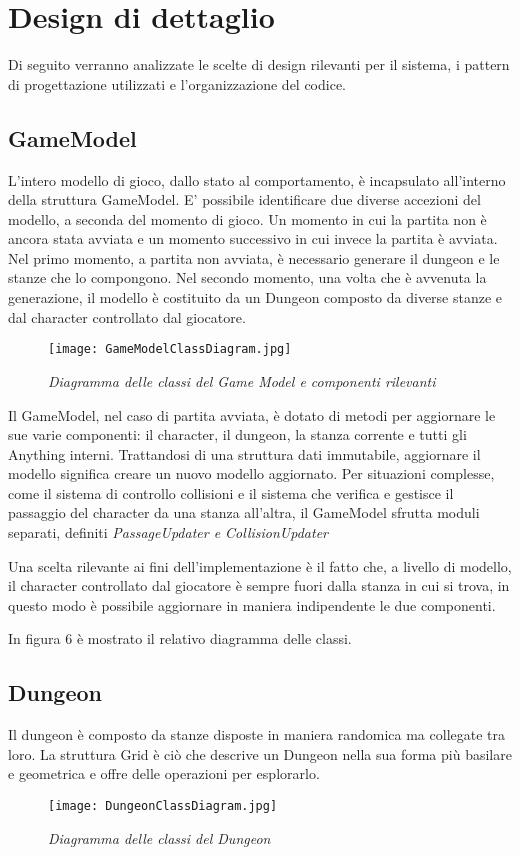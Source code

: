 \section{Design di dettaglio}
Di seguito verranno analizzate le scelte di design rilevanti per il sistema, i pattern di progettazione utilizzati e l'organizzazione del codice. 
\subsection{GameModel}
L'intero modello di gioco, dallo stato al comportamento, è incapsulato all'interno della struttura GameModel. E' possibile identificare due diverse accezioni del modello, a seconda del momento di gioco. 
Un momento in cui la partita non è ancora stata avviata e un momento successivo in cui invece la partita è avviata.
Nel primo momento, a partita non avviata, è necessario generare il dungeon e le stanze che lo compongono. 
Nel secondo momento, una volta che è avvenuta la generazione, il modello è costituito da un Dungeon composto da diverse stanze e dal character controllato dal giocatore. 

\begin{figure}[!hbt]
    \centering
    \texttt{[image: GameModelClassDiagram.jpg]}
    \caption{\textit{Diagramma delle classi del Game Model e componenti rilevanti}} 
\end{figure}
Il GameModel, nel caso di partita avviata, è dotato di metodi per aggiornare le sue varie componenti: il character, il dungeon, la stanza corrente e tutti gli Anything interni. 
Trattandosi di una struttura dati immutabile, aggiornare il modello significa creare un nuovo modello aggiornato. Per situazioni complesse, come il sistema di controllo collisioni e il sistema che verifica e gestisce il passaggio del character da una stanza all'altra, il GameModel sfrutta moduli separati, definiti \textit{PassageUpdater e CollisionUpdater}

Una scelta rilevante ai fini dell'implementazione è il fatto che, a livello di modello, il character controllato dal giocatore è sempre fuori dalla stanza in cui si trova, in questo modo è possibile aggiornare in maniera indipendente le due componenti.

In figura 6 è mostrato il relativo diagramma delle classi.

\newpage
\subsection{Dungeon}
Il dungeon è composto da stanze disposte in maniera randomica ma collegate tra loro. 
La struttura Grid è ciò che descrive un Dungeon nella sua forma più basilare e geometrica e offre delle operazioni per esplorarlo. 
\begin{figure}[!hbt]
    \centering
    \texttt{[image: DungeonClassDiagram.jpg]}
    \caption{\textit{Diagramma delle classi del Dungeon}} 
\end{figure}

